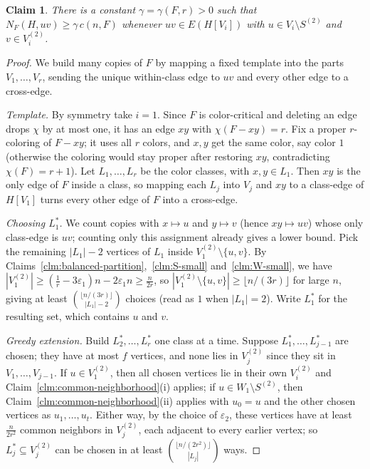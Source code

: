 \documentclass[11pt,a4paper]{article}
\newtheorem{claim}[theorem]{Claim}
\theoremstyle{definition}
\theoremstyle{plain}
\newcommand{\eps}{\varepsilon}
\renewcommand{\ge}{\geqslant}
\begin{document}
\begin{claim}\label{clm:local-count}
There is a constant $\gamma=\gamma(F,r)>0$ such that
$N_F(H,uv)\ge\gamma\,c(n,F)$ whenever $uv\in E(H[V_i])$
with $u\in V_i\setminus S^{(2)}$ and $v\in V_i^{(2)}$.
\end{claim}

\begin{proof}
We build many copies of $F$ by mapping a fixed template
into the parts $V_1,\dots,V_r$, sending the unique
within-class edge to $uv$ and every other edge to a
cross-edge.

\emph{Template.} By symmetry take $i=1$. Since $F$ is
color-critical and deleting an edge drops $\chi$ by at most
one, it has an edge $xy$ with $\chi(F-xy)=r$. Fix a proper
$r$-coloring of $F-xy$; it uses all $r$ colors, and $x,y$
get the same color, say color $1$ (otherwise the coloring
would stay proper after restoring $xy$, contradicting
$\chi(F)=r+1$). Let $L_1,\dots,L_r$ be the color classes,
with $x,y\in L_1$. Then $xy$ is the only edge of $F$ inside
a class, so mapping each $L_j$ into $V_j$ and $xy$ to a
class-edge of $H[V_1]$ turns every other edge of $F$ into a
cross-edge.

\emph{Choosing $L_1^{*}$.} We count copies with
$x\mapsto u$ and $y\mapsto v$ (hence $xy\mapsto uv$) whose
only class-edge is $uv$; counting only this assignment
already gives a lower bound. Pick the remaining $|L_1|-2$
vertices of $L_1$ inside $V_1^{(2)}\setminus\{u,v\}$. By
Claims~\ref{clm:balanced-partition},~\ref{clm:S-small}
and~\ref{clm:W-small}, we have
$|V_1^{(2)}|\ge(\tfrac1r-3\eps_1)n-2\eps_1n\ge\tfrac n{2r}$,
so $|V_1^{(2)}\setminus\{u,v\}|\ge\lfloor n/(3r)\rfloor$
for large $n$, giving at least
$\binom{\lfloor n/(3r)\rfloor}{|L_1|-2}$ choices (read as
$1$ when $|L_1|=2$). Write $L_1^{*}$ for the resulting set,
which contains $u$ and $v$.

\emph{Greedy extension.} Build $L_2^{*},\dots,L_r^{*}$ one
class at a time. Suppose $L_1^{*},\dots,L_{j-1}^{*}$ are
chosen; they have at most $f$ vertices, and none lies in
$V_j^{(2)}$ since they sit in $V_1,\dots,V_{j-1}$. If
$u\in V_1^{(2)}$, then all chosen vertices lie in their own
$V_i^{(2)}$ and Claim~\ref{clm:common-neighborhood}(i)
applies; if $u\in W_1\setminus S^{(2)}$, then
Claim~\ref{clm:common-neighborhood}(ii) applies with
$u_0=u$ and the other chosen vertices as $u_1,\dots,u_t$.
Either way, by the choice of $\eps_2$, these vertices have
at least $\tfrac n{2r^2}$ common neighbors in $V_j^{(2)}$,
each adjacent to every earlier vertex; so
$L_j^{*}\subseteq V_j^{(2)}$ can be chosen in at least
$\binom{\lfloor n/(2r^2)\rfloor}{|L_j|}$ ways.


\end{proof}
\end{document}
